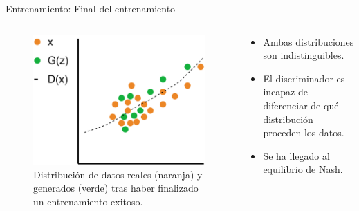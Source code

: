 \begin{frame}{Entrenamiento: Final del entrenamiento}

    \begin{columns}[T]
    \begin{column}{.48\textwidth}
    
    \begin{figure}
        \centering
        \includegraphics[width=\textwidth]{Slides/figures/GAN/Entreno distribucion 3.png}
        \caption{Distribución de datos reales (naranja) y generados (verde) tras haber finalizado un entrenamiento exitoso.}
    \end{figure}
    
    \end{column}
    \hfill
    \begin{column}{.48\textwidth}
    
    \begin{itemize}
        \item Ambas distribuciones son \alert{indistinguibles}.
        \item El discriminador es \alert{incapaz} de \alert{diferenciar} de qué distribución proceden los datos.
        \item Se ha llegado al \alert{equilibrio de Nash}\cite{cournot1897researches}.
    \end{itemize}

    \end{column}
    \end{columns}
    
\end{frame}

